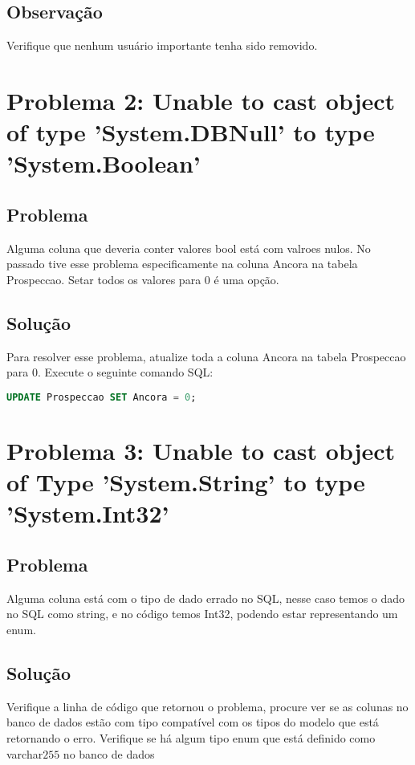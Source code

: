 \documentclass[12pt]{article}
\begin{document}
\subsection{Observação}
Verifique que nenhum usuário importante tenha sido removido.

\section{Problema 2: Unable to cast object of type 'System.DBNull' to type 'System.Boolean'}
\subsection{Problema}
Alguma coluna que deveria conter valores bool está com valroes nulos.
No passado tive esse problema especificamente na coluna Ancora na tabela Prospeccao. Setar todos os valores para 0 é uma opção.

\subsection{Solução}
Para resolver esse problema, atualize toda a coluna Ancora na tabela Prospeccao para 0. Execute o seguinte comando SQL:

\begin{lstlisting}[language=SQL]
UPDATE Prospeccao SET Ancora = 0;
\end{lstlisting}

\section{Problema 3: Unable to cast object of Type 'System.String' to type 'System.Int32'}
\subsection{Problema}
Alguma coluna está com o tipo de dado errado no SQL, nesse caso temos o dado no SQL como string, e no código temos Int32, podendo estar representando um enum.

\subsection{Solução}
Verifique a linha de código que retornou o problema, procure ver se as colunas no banco de dados estão com tipo compatível com os tipos do modelo que está retornando o erro.
Verifique se há algum tipo enum que está definido como varchar\(255\) no banco de dados
\end{document}
